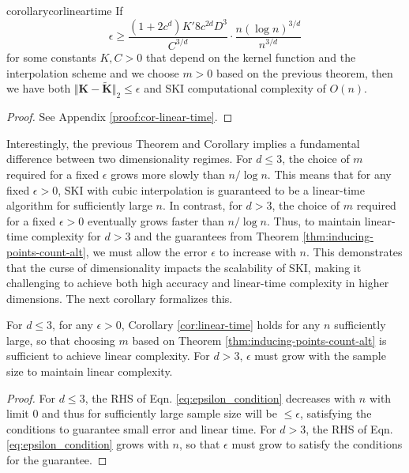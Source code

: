 \begin{restatable}{corollary}{corlineartime}\label{cor:linear-time}
    If
\begin{equation} \label{eq:epsilon_condition}
\epsilon \geq \frac{(1 + 2c^d) K' 8 c^{2d} D^3}{C^{3/d}} \cdot \frac{n (\log n)^{3/d}}{n^{3/d}}
\end{equation}
for some constants $K,C>0$ that depend on the kernel function and the interpolation scheme and we choose $m>0$ based on the previous theorem, then we have both $\Vert \textbf{K}-\tilde{\textbf{K}}\Vert_2\leq \epsilon$ and
SKI computational complexity of $O(n)$.
\end{restatable}
\begin{proof}
    See Appendix \ref{proof:cor-linear-time}.
\end{proof}

Interestingly, the previous Theorem and Corollary implies a fundamental difference between two dimensionality regimes. For $d \leq 3$, the choice of $m$ required for a fixed $\epsilon$ grows more slowly than $n/\log n$. This means that for any fixed $\epsilon > 0$, SKI with cubic interpolation is guaranteed to be a linear-time algorithm for sufficiently large $n$. In contrast, for $d > 3$, the choice of $m$ required for a fixed $\epsilon>0$ eventually grows faster than $n/\log n$. Thus, to maintain linear-time complexity for $d > 3$ and the guarantees from Theorem \ref{thm:inducing-points-count-alt}, we must allow the error $\epsilon$ to increase with $n$. This demonstrates that the curse of dimensionality impacts the scalability of SKI, making it challenging to achieve both high accuracy and linear-time complexity in higher dimensions. The next corollary formalizes this.
\begin{corollary}
    For $d\leq 3$, for any $\epsilon>0$, Corollary \ref{cor:linear-time} holds for any $n$ sufficiently large, so that choosing $m$ based on Theorem \ref{thm:inducing-points-count-alt} is sufficient to achieve linear complexity. For $d>3$, $\epsilon$ must grow with the sample size to maintain linear complexity.
\end{corollary}
\begin{proof}
    For $d\leq3 $, the RHS of Eqn. \ref{eq:epsilon_condition} decreases with $n$ with limit $0$ and thus for sufficiently large sample size will be $\leq \epsilon$, satisfying the conditions to guarantee small error and linear time. For $d>3$, the RHS of Eqn. \ref{eq:epsilon_condition} grows with $n$, so that $\epsilon$ must grow to satisfy the conditions for the guarantee. 
\end{proof}








